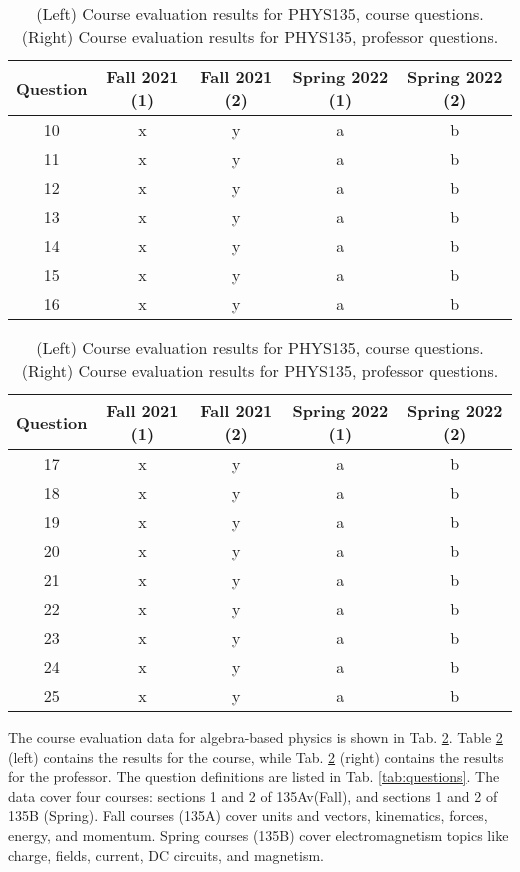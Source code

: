 \documentclass[../../main.tex]{subfiles}
\begin{document}
\begin{table}
\scriptsize
\centering
\begin{tabular}{| c | c | c | c | c |}
\hline
\hline
Question & Fall 2021 (1) & Fall 2021 (2) & Spring 2022 (1) & Spring 2022 (2) \\ \hline
10 & x & y & a & b \\ \hline
11 & x & y & a & b \\ \hline
12 & x & y & a & b \\ \hline
13 & x & y & a & b \\ \hline
14 & x & y & a & b \\ \hline
15 & x & y & a & b \\ \hline
16 & x & y & a & b \\ \hline
\hline
\end{tabular}
\begin{tabular}{| c | c | c | c | c |}
\hline
\hline
Question & Fall 2021 (1) & Fall 2021 (2) & Spring 2022 (1) & Spring 2022 (2) \\ \hline
17 & x & y & a & b \\ \hline
18 & x & y & a & b \\ \hline
19 & x & y & a & b \\ \hline
20 & x & y & a & b \\ \hline
21 & x & y & a & b \\ \hline
22 & x & y & a & b \\ \hline
23 & x & y & a & b \\ \hline
24 & x & y & a & b \\ \hline
25 & x & y & a & b \\ \hline
\hline
\end{tabular}
\caption{\label{tab:eval_135} (Left) Course evaluation results for PHYS135, course questions.  (Right) Course evaluation results for PHYS135, professor questions.}
\end{table}

The course evaluation data for algebra-based physics is shown in Tab. \ref{tab:eval_135}.  Table \ref{tab:eval_135} (left) contains the results for the course, while Tab. \ref{tab:eval_135} (right) contains the results for the professor.  The question definitions are listed in Tab. \ref{tab:questions}.  The data cover four courses: sections 1 and 2 of 135Av(Fall), and sections 1 and 2 of 135B (Spring).  Fall courses (135A) cover units and vectors, kinematics, forces, energy, and momentum.  Spring courses (135B) cover electromagnetism topics like charge, fields, current, DC circuits, and magnetism.
\end{document}
